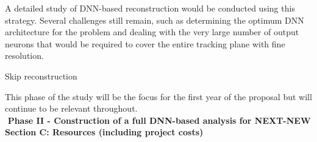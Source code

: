 \documentclass[11pt,a4paper]{article}
\begin{document}
A detailed study of DNN-based reconstruction would be conducted using this strategy. Several challenges still remain, such as determining the optimum DNN architecture for the problem and dealing with the very large number of output neurons that would be required to cover the entire tracking plane with fine resolution.

Skip reconstruction


This phase of the study will be the focus for the first year of the proposal but will continue to be relevant throughout.\\

\noindent\textbf{\textbullet\,\,Phase II - Construction of a full DNN-based analysis for NEXT-NEW}\\


{\noindent\textbf{Section C: Resources (including project costs)}}\\

%
%		

\newpage

\end{document}
